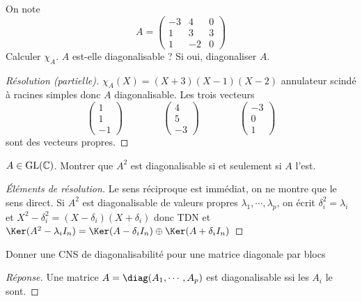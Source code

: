 \begin{exo}
    On note \[
        A= \begin{pmatrix}
            -3 & 4 & 0 \\ 1 & 3 & 3 \\ 1 & -2 & 0
        \end{pmatrix}
    \]
    Calculer $\chi_A$. $A$ est-elle diagonalisable ? Si oui, diagonaliser $A$.
\end{exo}

\begin{proof}[Résolution (partielle)]
    $\chi_A(X)=(X+3)(X-1)(X-2)$ annulateur scindé à racines simples donc $A$ diagonalisable. Les trois vecteurs \[
        \begin{pmatrix}
            1\\1\\-1
        \end{pmatrix}
        \qquad \qquad
        \begin{pmatrix}
            4\\5\\-3
        \end{pmatrix}
        \qquad \qquad
        \begin{pmatrix}
            -3\\0\\1
        \end{pmatrix}
    \]
    sont des vecteurs propres.
\end{proof}

\begin{exo}
    $A\in\mathrm{GL}(\mathbb C)$. Montrer que $A^2$ est diagonalisable si et seulement si $A$ l'est.
\end{exo}

\begin{proof}[Éléments de résolution]
    Le sens réciproque est immédiat, on ne montre que le sens direct. Si $A^2$ est diagonalisable de valeurs propres $\lambda_1, \cdots, \lambda_p$, on écrit $\delta_i^2=\lambda_i$ et $X^2-\delta_i^2=(X-\delta_i)(X+\delta_i)$ donc TDN et $\Ker(A^2-\lambda_i I_n)=\Ker(A-\delta_iI_n)\oplus\Ker(A+\delta_i I_n)$
\end{proof}

\begin{exo}
    Donner une CNS de diagonalisabilité pour une matrice diagonale par blocs
\end{exo}

\begin{proof}[Réponse]
    Une matrice $A=\diag(A_1, \cdots, A_p)$ est diagonalisable ssi les $A_i$ le sont.
\end{proof}

